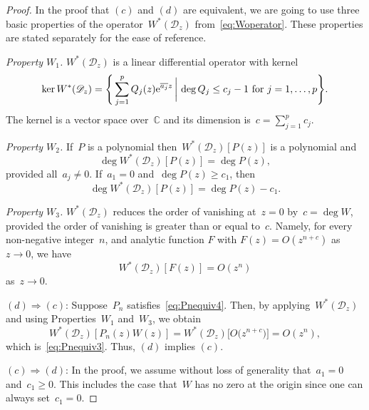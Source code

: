 \documentclass[pdftex]{sigma}
\numberwithin{equation}{section}
\newcommand*{\Cset}{\mathbb{C}} %
\begin{document}
\begin{proof}
 In the proof that $(c)$ and $(d)$ are equivalent, we are going to use three basic properties of the operator~$W^*(\mathscr{D}_z)$ from~\eqref{eq:Woperator}. These properties are stated separately for the ease of reference.

 \medskip\noindent
 \textit{Property $W_1$.} $W^*(\mathscr{D}_z)$ is a linear differential operator with kernel
 \begin{equation}
 \label{eq:Wproperty1}
 \ker W^*(\mathscr{D}_z) = \Bigg\{ \sum_{j=1}^p Q_j(z) {\rm e}^{\overline{a_j} z} \, \bigg|\, \deg{Q_j} \leq c_j-1 \text{ for } j=1, \dots, p \Bigg\}.
 \end{equation}
 The kernel is a vector space over~$\Cset$ and its dimension is~$c = \sum_{j=1}^p c_j$.

 \medskip\noindent
 \textit{Property $W_2$.}
 If~$P$ is a polynomial then~$W^*(\mathscr{D}_z) [P(z)]$ is a polynomial and
 \begin{equation}
 \label{eq:Wproperty2}
 \deg W^*(\mathscr{D}_z) [P(z)] = \deg P(z),
 \end{equation}
 provided all~$a_j \neq 0$. If~$a_1 =0$ and~$\deg P(z) \geq c_1$, then
 \begin{equation}
 \label{eq:Wproperty2alt}
 \deg W^*(\mathscr{D}_z) [P(z)] = \deg P(z)-c_1.
 \end{equation}

 \medskip\noindent
 \textit{Property $W_3$.} $W^*(\mathscr{D}_z)$ reduces the order of vanishing at~$z=0$ by~$c = \deg W$, provided the order of vanishing is greater than or equal to~$c$. Namely, for every non-negative integer~$n$, and analytic function $F$ with $F(z) = O(z^{n+c})$ as $z \to 0$, we have
 \begin{equation}
 \label{eq:Wproperty3}
 W^*(\mathscr{D}_z) [ F(z) ] = O(z^n)
 \end{equation}
 as~$z \to 0$.

 \smallskip\noindent
 $(d) \Rightarrow (c)$:
 Suppose~$P_n$ satisfies~\eqref{eq:Pnequiv4}. Then, by applying~$W^*(\mathscr{D}_z)$ and using Properties~$W_1$ and~$W_3$, we obtain
 \begin{equation}
 W^*(\mathscr{D}_z) [P_n(z) W(z)] = W^*(\mathscr{D}_z) \big[ O\big(z^{n+c}\big)\big] = O(z^n),
 \end{equation}
 which is~\eqref{eq:Pnequiv3}. Thus, $(d)$ implies $(c)$.

 \smallskip\noindent
$(c) \Rightarrow (d)$:
 In the proof, we assume without loss of generality that~$a_1 =0$ and~$c_1 \geq 0$. This includes the case that~$W$ has no zero at the origin since one can always set~$c_1=0$.


\end{proof}
\end{document}
